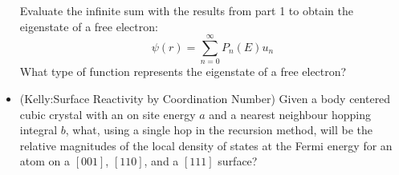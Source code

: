 \begin{itemize}
Evaluate the infinite sum with the results from part 1 to obtain the eigenstate
of a free electron:
%
\begin{equation}
\psi(r) = \sum_{n=0}^{\infty}P_{n}(E)u_{n}
\end{equation}
%
What type of function represents the eigenstate of a free electron?

\item (Kelly:Surface Reactivity by Coordination Number) Given a body centered cubic crystal with an on site energy $a$ and a nearest neighbour hopping integral
      $b$, what, using a single hop in the recursion method, will be the relative magnitudes of the local density of states 
      at the Fermi energy for an atom on a $[001]$, $[110]$, and a $[111]$ surface?

\end{itemize}
%
%
%
%
%
%
%
%
%
%
%
%
%
%
%
%
%
%
%

